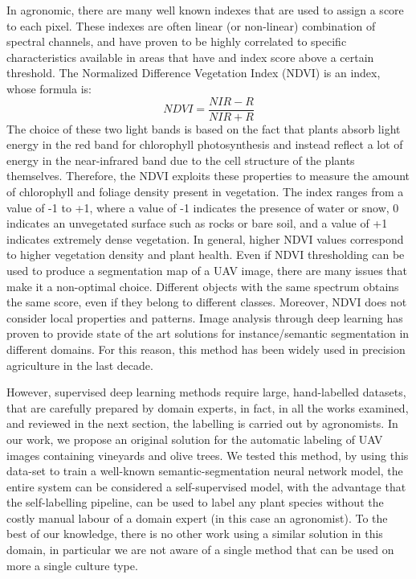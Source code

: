 \documentclass[comsoc,final]{IEEEtran}
\newcommand{\todo}[1]{\textcolor{red}{#1}}
\begin{document}
In agronomic, there are many well known indexes that are used to assign a score to each pixel. These indexes are often linear (or non-linear) combination of spectral channels, and have proven to be highly correlated to specific characteristics available in areas that have and index score above a certain threshold. The Normalized Difference Vegetation Index (NDVI) is an index, whose formula is:
    \[
    NDVI = \frac{NIR-R}{NIR+R}
    \]
    The choice of these two light bands is based on the fact that plants absorb light energy in the red band for chlorophyll photosynthesis and instead reflect a lot of energy in the near-infrared band due to the cell structure of the plants themselves. Therefore, the NDVI exploits these properties to measure the amount of chlorophyll and foliage density present in vegetation.
The index ranges from a value of -1 to +1, where a value of -1 indicates the presence of water or snow, 0 indicates an unvegetated surface such as rocks or bare soil, and a value of +1 indicates extremely dense vegetation. In general, higher NDVI values correspond to higher vegetation density and plant health.
Even if NDVI thresholding can be used to produce a segmentation map of a UAV image, there are many issues that make it a non-optimal choice. Different objects with the same spectrum obtains the same score, even if they belong to different classes. Moreover, NDVI does not consider local properties and patterns. Image analysis through deep learning has proven to provide state of the art solutions for instance/semantic segmentation in different domains. For this reason, this method has been widely used in precision agriculture in the last decade.

However, supervised deep learning methods require large, hand-labelled datasets, that are carefully prepared by domain experts, in fact, in all the works examined, and reviewed in the next section, the labelling is carried out by agronomists. In our work, we propose an original solution for the automatic labeling of UAV images containing vineyards and olive trees. We tested this method, by using this data-set to train a well-known semantic-segmentation neural network model, the entire system can be considered a self-supervised model, with the advantage that the self-labelling pipeline, can be used to label any plant species without the costly manual labour of a domain expert (in this case an agronomist). To the best of our knowledge, there is no other work using a similar solution in this domain, in particular we are not aware of a single method that can be used on more a single culture type. 
\end{document}
